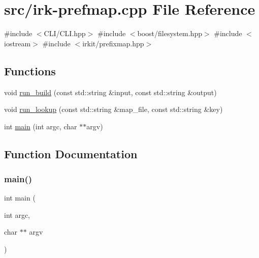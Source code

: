 \hypertarget{irk-prefmap_8cpp}{}\section{src/irk-\/prefmap.cpp File Reference}
\label{irk-prefmap_8cpp}
{\ttfamily \#include $<$C\+L\+I/\+C\+L\+I.\+hpp$>$}\newline
{\ttfamily \#include $<$boost/filesystem.\+hpp$>$}\newline
{\ttfamily \#include $<$iostream$>$}\newline
{\ttfamily \#include $<$irkit/prefixmap.\+hpp$>$}\newline
\subsection*{Functions}
\begin{DoxyCompactItemize}
\item 
void \mbox{\hyperlink{irk-prefmap_8cpp_a4330c09b4157029d4e97f57d221f54ea}{run\+\_\+build}} (const std\+::string \&input, const std\+::string \&output)
\item 
void \mbox{\hyperlink{irk-prefmap_8cpp_a3297f4a7dd9fab2d2fc9860efc147021}{run\+\_\+lookup}} (const std\+::string \&map\+\_\+file, const std\+::string \&key)
\item 
int \mbox{\hyperlink{irk-prefmap_8cpp_a3c04138a5bfe5d72780bb7e82a18e627}{main}} (int argc, char $\ast$$\ast$argv)
\end{DoxyCompactItemize}


\subsection{Function Documentation}
\mbox{\label{irk-prefmap_8cpp_a3c04138a5bfe5d72780bb7e82a18e627}} 
\subsubsection{\texorpdfstring{main()}{main()}}
{\footnotesize\ttfamily int main (\begin{DoxyParamCaption}\item[{int}]{argc,  }\item[{char $\ast$$\ast$}]{argv }\end{DoxyParamCaption})}

